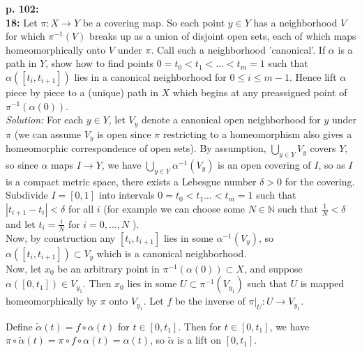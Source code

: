 \documentclass[a4paper]{article}
\begin{document}
    \textbf{p. 102:}\\
    \textbf{18:} Let $\pi  \colon X \to Y$ be a covering map. So each point $y
    \in Y$ has a neighborhood $V$ for which $\pi^{-1}(V)$ breaks up as a union
    of disjoint open sets, each of which maps homeomorphically onto $V$ under
    $\pi$. Call such a neighborhood 'canonical'. If $\alpha$ is a path in $Y$,
    show how to find points $0 = t_0 < t_1 < \ldots < t_m = 1$ such that
    $\alpha \left( \left[ t_i, t_{i+1} \right]  \right) $ lies in a canonical
    neighborhood for $0 \le i \le m-1$. Hence lift $\alpha$ piece by piece to a
    (unique) path in $X$ which begins at any preassigned point of
    $\pi^{-1}\left( \alpha(0) \right) $.\\
    \linebreak
    \textit{Solution:} For each $y \in Y$, let
    $V_y$ denote a canonical open neighborhood for $y$ under
    $\pi$ (we can assume $V_y$ is open since $\pi$ restricting to
    a homeomorphism also gives a homeomorphic correspondence of open sets).
    By assumption, $\bigcup_{y \in Y} V_y$ covers $Y$, so
    since $\alpha$ maps $I \to Y$, we have
    $\bigcup_{y \in Y} \alpha^{-1}(V_y)$ is an open covering of $I $, so as $I$ is a compact
    metric space, there exists a Lebesgue number $ \delta > 0$
 for the covering. Subdivide $I = \left[ 0,1 \right] $ into intervals
 $0 = t_0 < t_1 \ldots < t_m = 1$ such that
 $\left| t_{i+1}-t_i \right| < \delta$ for all $i$ (for example we can choose
 some $N \in \mathbb{N}$ such that
 $\frac{1}{N} < \delta$ and let
 $t_i = \frac{i}{N}$ for $i = 0, \ldots, N$ ).\\
 \linebreak
 Now, by construction
any $\left[ t_i, t_{i+1} \right] $ lies in
some $\alpha^{-1}(V_y)$, so
$\alpha \left( \left[ t_i, t_{i+1} \right]  \right) 
\subset V_y$ which is a canonical neighborhood.\\
\linebreak
Now, let $x_0$ be an arbitrary point in $\pi^{-1}\left( \alpha (0) \right) \subset 
X$, and suppose $\alpha(\left[ 0, t_1 \right] ) \in V_{y_1}$. Then $x_0$ lies
in some $U \subset \pi^{-1} (V_{y_1})$ such that
$U$ is mapped homeomorphically by $\pi$ onto $V_{y_1}$. Let
$f$ be the inverse of $\pi|_{U}  \colon U \to V_{y_1}$.


Define
$\tilde{\alpha} (t) = f \circ \alpha(t)$ for $t \in \left[ 0, t_1 \right] $.
Then for $t \in \left[ 0, t_1 \right] $, we have
$\pi \circ \tilde{\alpha}(t) = 
\pi \circ f \circ \alpha(t) =
\alpha(t)$, so
$\tilde{\alpha}$ is a lift on
$\left[ 0, t_1 \right] $.\\
\linebreak
\end{document}
